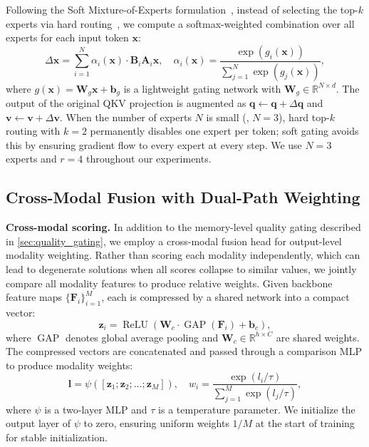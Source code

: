 Following the Soft Mixture-of-Experts formulation~\cite{puigcerver2024softmoe}, instead of selecting the top-$k$ experts via hard routing~\cite{zhu2024moe, shazeer2017moe}, we compute a softmax-weighted combination over all experts for each input token $\mathbf{x}$:
\begin{equation}
  \Delta \mathbf{x} = \sum_{i=1}^{N} \alpha_i(\mathbf{x}) \cdot \mathbf{B}_i \mathbf{A}_i \mathbf{x},
  \quad \alpha_i(\mathbf{x}) = \frac{\exp(g_i(\mathbf{x}))}{\sum_{j=1}^{N} \exp(g_j(\mathbf{x}))},
  \label{eq:soft_moe}
\end{equation}
where $g(\mathbf{x}) = \mathbf{W}_g \mathbf{x} + \mathbf{b}_g$ is a lightweight gating network with $\mathbf{W}_g \in \mathbb{R}^{N \times d}$.
The output of the original QKV projection is augmented as $\mathbf{q} \leftarrow \mathbf{q} + \Delta \mathbf{q}$ and $\mathbf{v} \leftarrow \mathbf{v} + \Delta \mathbf{v}$.
When the number of experts $N$ is small (\eg, $N{=}3$), hard top-$k$ routing with $k{=}2$ permanently disables one expert per token; soft gating avoids this by ensuring gradient flow to every expert at every step.
We use $N{=}3$ experts and $r{=}4$ throughout our experiments.


\subsection{Cross-Modal Fusion with Dual-Path Weighting}
\label{sec:cross_modal}

\noindent\textbf{Cross-modal scoring.}
In addition to the memory-level quality gating described in \cref{sec:quality_gating}, we employ a cross-modal fusion head for output-level modality weighting.
Rather than scoring each modality independently, which can lead to degenerate solutions when all scores collapse to similar values, we jointly compare all modality features to produce relative weights.
Given backbone feature maps $\{\mathbf{F}_i\}_{i=1}^{M}$, each is compressed by a shared network into a compact vector:
\begin{equation}
  \mathbf{z}_i = \operatorname{ReLU}(\mathbf{W}_c \cdot \operatorname{GAP}(\mathbf{F}_i) + \mathbf{b}_c),
  \label{eq:compress}
\end{equation}
where $\operatorname{GAP}$ denotes global average pooling and $\mathbf{W}_c \in \mathbb{R}^{h \times C}$ are shared weights.
The compressed vectors are concatenated and passed through a comparison MLP to produce modality weights:
\begin{equation}
  \mathbf{l} = \psi([\mathbf{z}_1; \mathbf{z}_2; \ldots; \mathbf{z}_M]),
  \quad w_i = \frac{\exp(l_i / \tau)}{\sum_{j=1}^{M} \exp(l_j / \tau)},
  \label{eq:cross_modal}
\end{equation}
where $\psi$ is a two-layer MLP and $\tau$ is a temperature parameter.
We initialize the output layer of $\psi$ to zero, ensuring uniform weights $1/M$ at the start of training for stable initialization.

